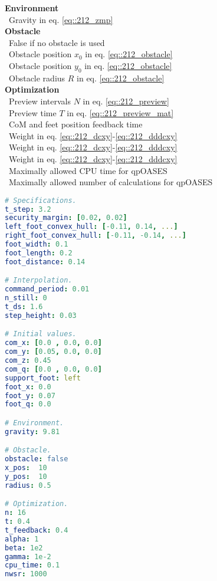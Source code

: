 \begin{minipage}[t]{1.\textwidth}
\begin{minipage}{0.5\textwidth}
{			\hfill \textbf{Environment}\\
			\mbox{}~\hfill Gravity in eq. \ref{eq::212_zmp}\\
			
			\hfill \textbf{Obstacle}\\
			\mbox{}~\hfill False if no obstacle is used\\
			\mbox{}~\hfill Obstacle position $x_0$ in eq. \ref{eq::212_obstacle}\\
			\mbox{}~\hfill Obstacle position $y_0$ in eq. \ref{eq::212_obstacle}\\
			\mbox{}~\hfill Obstacle radius $R$ in eq. \ref{eq::212_obstacle}\\
			
			\hfill \textbf{Optimization}\\
			\mbox{}~\hfill Preview intervals $N$ in eq. \ref{eq::212_preview}\\
			\mbox{}~\hfill Preview time $T$ in eq. \ref{eq::212_preview_mat}\\
			\mbox{}~\hfill CoM and feet position feedback time\\
			\mbox{}~\hfill Weight in eq. \ref{eq::212_dcxy}-\ref{eq::212_dddcxy}\\
			\mbox{}~\hfill Weight in eq. \ref{eq::212_dcxy}-\ref{eq::212_dddcxy}\\
			\mbox{}~\hfill Weight in eq. \ref{eq::212_dcxy}-\ref{eq::212_dddcxy}\\
			\mbox{}~\hfill Maximally allowed CPU time for qpOASES\\
			\mbox{}~\hfill Maximally allowed number of calculations for qpOASES}
	\end{minipage}
	\begin{minipage}{0.5\textwidth}
		\begin{lstlisting}[language=yaml]
# Specifications.
t_step: 3.2
security_margin: [0.02, 0.02]
left_foot_convex_hull: [-0.11, 0.14, ...]
right_foot_convex_hull: [-0.11, -0.14, ...]
foot_width: 0.1
foot_length: 0.2
foot_distance: 0.14

# Interpolation.
command_period: 0.01
n_still: 0
t_ds: 1.6
step_height: 0.03

# Initial values.
com_x: [0.0 , 0.0, 0.0]
com_y: [0.05, 0.0, 0.0]
com_z: 0.45
com_q: [0.0 , 0.0, 0.0]
support_foot: left
foot_x: 0.0
foot_y: 0.07
foot_q: 0.0

# Environment.
gravity: 9.81

# Obstacle.
obstacle: false
x_pos:  10
y_pos:  10
radius: 0.5

# Optimization.
n: 16
t: 0.4
t_feedback: 0.4
alpha: 1
beta: 1e2
gamma: 1e-2
cpu_time: 0.1
nwsr: 1000
		\end{lstlisting}
	\end{minipage}
	\label{sec::32_pg_conf}
\end{minipage}
